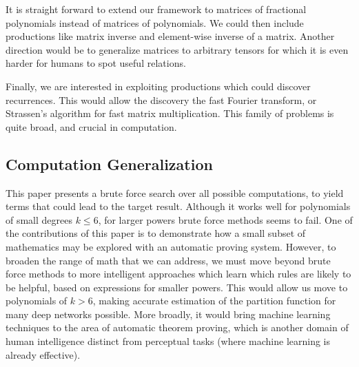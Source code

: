 It is straight forward to extend our framework to matrices of fractional
polynomials instead of matrices of polynomials.  We could
then include productions like matrix inverse and element-wise inverse of
a matrix.  Another direction would be to generalize matrices to arbitrary tensors
for which it is even harder for humans to spot useful relations.

Finally, we are interested in exploiting productions which could discover 
recurrences. This would allow the discovery the fast Fourier transform, or
Strassen's algorithm for fast matrix multiplication. This family of problems is quite broad,
and crucial in computation.


\subsection{Computation Generalization}\label{agenda}

This paper presents a brute force search over all possible computations, 
to yield terms that could lead to the target result. Although it works
well for polynomials of small degrees $k \leq 6$, for larger powers 
brute force methods seems to fail. One of the contributions of this paper is to
demonstrate how a small subset of mathematics may be explored with an automatic proving
system. However, to broaden the range of math that we can address, we
must move beyond brute force methods to more intelligent approaches
which learn which rules are likely to be helpful, based on expressions
for smaller powers. This would allow us move to polynomials of $k > 6$,
making accurate estimation of the partition function for many deep
networks possible. More broadly, it would bring machine learning techniques
to the area of automatic theorem proving, which is another domain of
human intelligence distinct from perceptual tasks (where machine
learning is already effective). 




